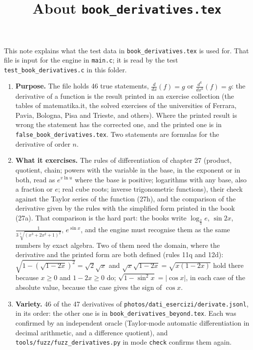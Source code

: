 \documentclass[11pt,a4paper]{article}
\title{About \texttt{book\_derivatives.tex}}
\author{}
\date{}
\begin{document}
\maketitle
This note explains what the test data in \texttt{book\_derivatives.tex} is used for. That file is input for the engine in \texttt{main.c}; it is read by the test \texttt{test\_book\_derivatives.c} in this folder.

\begin{enumerate}
\item \textbf{Purpose.} The file holds 46 true statements, $\frac{d}{dx}\left( f \right) = g$ or $\frac{d^{k}}{dx^{k}}\left( f \right) = g$: the derivative of a function is the result printed in an exercise collection (the tables of matematika.it, the solved exercises of the universities of Ferrara, Pavia, Bologna, Pisa and Trieste, and others). Where the printed result is wrong the statement has the corrected one, and the printed one is in \texttt{false\_book\_derivatives.tex}. Two statements are formulas for the derivative of order $n$.

\item \textbf{What it exercises.} The rules of differentiation of chapter 27 (product, quotient, chain; powers with the variable in the base, in the exponent or in both, read as $e^{v \ln u}$ where the base is positive; logarithms with any base, also a fraction or $e$; real cube roots; inverse trigonometric functions), their check against the Taylor series of the function (27h), and the comparison of the derivative given by the rules with the simplified form printed in the book (27a). That comparison is the hard part: the books write $\log_{\frac{2}{3}} e$, $\sin 2x$, $\frac{1}{3\sqrt[3]{(x^{3} + 2x^{2} + 1)^{2}}}$, $e^{\sin x}$, and the engine must recognise them as the same numbers by exact algebra. Two of them need the domain, where the derivative and the printed form are both defined (rules 11q and 12d): $\sqrt{1 - (\sqrt{1 - 2x})^{2}} = \sqrt{2}\sqrt{x}$ and $\sqrt{x}\sqrt{1 - 2x} = \sqrt{x(1 - 2x)}$ hold there because $x \ge 0$ and $1 - 2x \ge 0$ do; $\sqrt{1 - \sin^{2} x} = |\cos x|$, in each case of the absolute value, because the case gives the sign of $\cos x$.

\item \textbf{Variety.} 46 of the 47 derivatives of \texttt{photos/dati\_esercizi/derivate.jsonl}, in its order: the other one is in \texttt{book\_derivatives\_beyond.tex}. Each was confirmed by an independent oracle (Taylor-mode automatic differentiation in decimal arithmetic, and a difference quotient), and \texttt{tools/fuzz/fuzz\_derivatives.py} in mode \texttt{check} confirms them again.


\end{enumerate}
\end{document}
